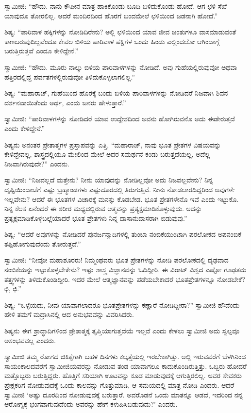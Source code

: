  ಸ್ವಾಮೀಜಿ: “ಹೌದು. ನಾನು ಕೌಪೀನ ಮಾತ್ರ ಹಾಕಿಕೊಂಡು ಬೂದಿ ಬಳಿದುಕೊಂಡು ಹೋದೆ. ಆಗ ಛಳಿ ಸೆಖೆ ಯಾವುದೂ ತೋರಲಿಲ್ಲ. ಆದರೆ ಮಂದಿರದಿಂದ ಹೊರಗೆ ಬಂದಮೇಲೆ ಛಳಿಯಿಂದ ಜಡನಾಗಿ ಹೋದೆ.” 

\newpage

 ಶಿಷ್ಯ: “ಪಾರಿವಾಳ ಹಕ್ಕಿಗಳನ್ನು ನೋಡಿದಿರೇನು? ಅಲ್ಲಿ ಛಳಿಯಿಂದ ಯಾವ ಜೀವ ಜಂತುಗಳೂ ವಾಸಮಾಡುವಂತೆ ಕಾಣಬರುವುದಿಲ್ಲವೆಂದೂ ಕೇವಲ ಬಿಳಿಯ ಪಾರಿವಾಳ ಪಕ್ಷಿಗಳ ಒಂದು ಹಿಂಡು ಎಲ್ಲಿಂದಲೋ ಆಗಿಂದಾಗ್ಗೆ ಬರುತ್ತಿರುತ್ತವೆ ಎಂದೂ ಕೇಳಿದ್ದೇನೆ.” 

 ಸ್ವಾಮೀಜಿ: “ಹೌದು. ಮೂರು ನಾಲ್ಕು ಬಿಳಿಯ ಪಾರಿವಾಳಗಳನ್ನು ನೋಡಿದೆ. ಅವು ಗುಹೆಯಲ್ಲಿರುವುವೋ ಅಥವಾ ಹತ್ತಿರದಲ್ಲಿದ್ದ ಪರ್ವತಗಳಲ್ಲಿರುವುವೋ‌ ತಿಳಿದುಕೊಳ್ಳಲಾಗಲಿಲ್ಲ.” 

 ಶಿಷ್ಯ: “ಮಹಾರಾಜ್, ಗುಹೆಯಿಂದ ಹೊರಕ್ಕೆ ಬಂದು ಬಿಳಿಯ ಪಾರಿವಾಳಗಳನ್ನು ನೋಡಿದರೆ ನಿಜವಾಗಿ ಶಿವನ ದರ್ಶನವಾಯಿತೆಂದು ಅರ್ಥ, ಎಂದು ಜನರು ಹೇಳುತ್ತಾರೆ.” 

 ಸ್ವಾಮೀಜಿ: “ಪಾರಿವಾಳಗಳನ್ನು ನೋಡಿದರೆ ಯಾವ ಉದ್ದೇಶದಿಂದ ಅವನು ಹೋಗಿರುವನೊ ಅದು ಈಡೇರುತ್ತದೆ ಎಂದು ಕೇಳಿದ್ದೇನೆ.” 

 ಶಿಷ್ಯನು ಅನಂತರ ಪ್ರೇತಾತ್ಮಗಳ ಪ್ರಸ್ತಾಪವನ್ನು ಎತ್ತಿ, “ಮಹಾರಾಜ್, ನಾವು ಭೂತ ಪ್ರೇತಗಳ ವಿಷಯವನ್ನು ಕೇಳಿದ್ದೇವಲ್ಲ, ಶಾಸ್ತ್ರದಲ್ಲಿಯೂ ಮೇಲಿಂದ ಮೇಲೆ ಅದರ ಸಮರ್ಥನೆ ಕಂಡು ಬರುತ್ತದೆಯಲ್ಲ, ಅದೆಲ್ಲ ನಿಜವಾಗಿರುವುದೇ?” ಎಂದನು. 

 ಸ್ವಾಮೀಜಿ: “ನಿಜವಲ್ಲದೆ ಮತ್ತೇನು? ನೀನು ಯಾವುದನ್ನು ನೋಡಿಲ್ಲವೋ ಅದು ನಿಜವಲ್ಲವೇನು? ನಿನ್ನ ದೃಷ್ಟಿಯಿಂದಾಚೆಗೆ ಎಷ್ಟು ಬ್ರಹ್ಮಾಂಡಗಳು ಎಷ್ಟು\break ದೂರದಲ್ಲಿ ತಿರುಗುತ್ತಿವೆ. ನೀನು ನೋಡಲಾರದಿದ್ದರಿಂದ ಅವುಗಳೇ ಇಲ್ಲವೇನು? ಆದರೆ ಈ ಭೂತಗಳ ವಿಚಾರಕ್ಕೆ ಮನಸ್ಸು ಕೊಡಬೇಡ. ಭೂತ ಪ್ರೇತಗಳೇನೊ ಇವೆ ಎಂದು ಇಟ್ಟುಕೊ. ನಿನ್ನ ಕೆಲಸ ಏನೆಂದರೆ ಈ ಶರೀರ ಮಧ್ಯದಲ್ಲಿರುವ ಆತ್ಮವನ್ನು ಪ್ರತ್ಯಕ್ಷಮಾಡಿಕೊಳ್ಳುವುದು. ಅದನ್ನು ಪ್ರತ್ಯಕ್ಷಮಾಡಿಕೊಳ್ಳಬಲ್ಲೆಯಾದರೆ ಭೂತ ಪ್ರೇತಗಳು ನಿನ್ನ ದಾಸಾನುದಾಸರಾಗಿ ಬಿಡುವುವು.” 

 ಶಿಷ್ಯ: “ಆದರೆ ಅವುಗಳನ್ನು ನೋಡಿದರೆ ಪುನರ್ಜನ್ಮಾದಿಗಳಲ್ಲಿ ತುಂಬಾ ನಂಬಿಕೆಯುಂಟಾಗಿ ಪರಲೋಕದ ಅಪನಂಬಿಕೆ ತಪ್ಪಿಹೋಗುವುದೆಂದು ತೋರುತ್ತದೆ.” 

 ಸ್ವಾಮೀಜಿ: “ನೀವೋ ಮಹಾಶೂರರು! ನಿಮ್ಮಂಥವರು ಭೂತ ಪ್ರೇತಗಳನ್ನು ನೋಡಿ ಪರಲೋಕದಲ್ಲಿ ದೃಢವಾದ ನಂಬಿಕೆಯನ್ನು ಇಟ್ಟುಕೊಳ್ಳಬೇಕೇನು? ಇಷ್ಟು ಶಾಸ್ತ್ರ ವಿಜ್ಞಾನವನ್ನು ಓದಿದ್ದೀರಿ. ಈ ವಿರಾಟ್ ವಿಶ್ವದ ಎಷ್ಟೋ ಗೂಢತಮ ತತ್ತ್ವಗಳನ್ನು ತಿಳಿದುಕೊಂಡಿದ್ದೀರಿ. ಇದರ ಮೇಲೆ ಆತ್ಮಜ್ಞಾನವನ್ನು ಪಡೆಯಬೇಕಾದರೆ ಭೂತಪ್ರೇತಗಳನ್ನೂ ನೋಡಬೇಕೆ? ಛಿ, ಛಿ.” 

 ಶಿಷ್ಯ: “ಒಳ್ಳೆಯದು, ನೀವು ಯಾವಾಗಲಾದರೂ ಭೂತಪ್ರೇತಗಳನ್ನು ಕಣ್ಣಾರೆ ನೋಡಿದ್ದೀರಾ?” ಸ್ವಾಮೀಜಿ ಹೌದೆಂದು ಹೇಳಿ ತಮಗೆ ಮದ್ರಾಸಿನಲ್ಲಿ ಆದ ಅನುಭವವನ್ನು ವಿವರಿಸಿದರು. 

\newpage

 ಶಿಷ್ಯನು ಈಗ ಶ್ರಾದ್ಧಾದಿಗಳಿಂದ ಪ್ರೇತಾತ್ಮಕ್ಕೆ ತೃಪ್ತಿಯಾಗುತ್ತದೆಯೆ ಇಲ್ಲವೆ ಎಂದು ಕೇಳಲು ಸ್ವಾಮೀಜಿ ಅದು ಸ್ವಲ್ಪವೂ ಅಸಂಭವವಲ್ಲ ಎಂದರು. 

 ಸ್ವಾಮೀಜಿ ತಮ್ಮ ರೋಗದ ಚಿಕಿತ್ಸೆಗಾಗಿ ಬಹಳ ದಿನಗಳು ಕಲ್ಕತ್ತೆಯಲ್ಲಿ ಇರಬೇಕಾಗಿತ್ತು. ಅಲ್ಲಿ ಇರುವವರೆಗೆ ಬೆಳಗಿನಿಂದ ಸಾಯಂಕಾಲದವರೆಗೆ ಸ್ವಾಮೀಜಿಯವರನ್ನು ನೋಡುವ ತಂಡ ಯಾವಾಗಲೂ ಕಾದುಕೊಂಡಿರುತ್ತಿತ್ತು. ಒಬ್ಬರು ಹೋದರೆ ಮತ್ತೊಬ್ಬರು ಬರುತ್ತಿದ್ದರು. ಹೊತ್ತಿಗೆ ಸರಿಯಾಗಿ ಊಟವನ್ನು ಕೂಡ ಮಾಡುವುದಕ್ಕೆ ಆಗುತ್ತಿರಲಿಲ್ಲ. ಅವರ ಸೇವಕರು ಪ್ರೇಕ್ಷಕರಿಗೆ ನೋಡುವುದಕ್ಕೆ ಒಂದು ಕಾಲವನ್ನು ಗೊತ್ತುಮಾಡಿ, ಆ ಸಮಯದಲ್ಲಿ ಮಾತ್ರ ನೋಡಿ ಎಂದರು. ಆದರೆ ಸ್ವಾಮೀಜಿ ‘ಅಷ್ಟು ದೂರದಿಂದ ನೋಡುವುದಕ್ಕೆ ಬರುತ್ತಾರೆ. ಅವರೊಡನೆ ಒಂದು ಮಾತನ್ನೂ ಆಡದೆ, ಇದರಿಂದ ನನ್ನ ಆರೋಗ್ಯಕ್ಕೆ ಭಂಗವಾಗುವುದೆಂದು ಅವರನ್ನು ಹೇಗೆ ಕಳುಹಿಸಿಬಿಡುವುದು?’ ಎಂದರು. 

